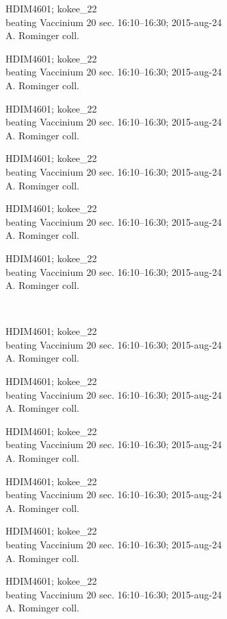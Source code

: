\documentclass[2pt]{extarticle}
\begin{document}
\noindent
\parbox{0.16\textwidth}{\tiny \raggedright \rule[-0.3\baselineskip]{0pt}{10pt}HDIM4601; kokee\_22\\ beating Vaccinium 20 sec. 16:10--16:30; 2015-aug-24\\ A. Rominger coll.}
\parbox{0.16\textwidth}{\tiny \raggedright \rule[-0.3\baselineskip]{0pt}{10pt}HDIM4601; kokee\_22\\ beating Vaccinium 20 sec. 16:10--16:30; 2015-aug-24\\ A. Rominger coll.}
\parbox{0.16\textwidth}{\tiny \raggedright \rule[-0.3\baselineskip]{0pt}{10pt}HDIM4601; kokee\_22\\ beating Vaccinium 20 sec. 16:10--16:30; 2015-aug-24\\ A. Rominger coll.}
\parbox{0.16\textwidth}{\tiny \raggedright \rule[-0.3\baselineskip]{0pt}{10pt}HDIM4601; kokee\_22\\ beating Vaccinium 20 sec. 16:10--16:30; 2015-aug-24\\ A. Rominger coll.}
\parbox{0.16\textwidth}{\tiny \raggedright \rule[-0.3\baselineskip]{0pt}{10pt}HDIM4601; kokee\_22\\ beating Vaccinium 20 sec. 16:10--16:30; 2015-aug-24\\ A. Rominger coll.}
\parbox{0.16\textwidth}{\tiny \raggedright \rule[-0.3\baselineskip]{0pt}{10pt}HDIM4601; kokee\_22\\ beating Vaccinium 20 sec. 16:10--16:30; 2015-aug-24\\ A. Rominger coll.} \\ 
\vspace{0.001in} 

\noindent
\parbox{0.16\textwidth}{\tiny \raggedright \rule[-0.3\baselineskip]{0pt}{10pt}HDIM4601; kokee\_22\\ beating Vaccinium 20 sec. 16:10--16:30; 2015-aug-24\\ A. Rominger coll.}
\parbox{0.16\textwidth}{\tiny \raggedright \rule[-0.3\baselineskip]{0pt}{10pt}HDIM4601; kokee\_22\\ beating Vaccinium 20 sec. 16:10--16:30; 2015-aug-24\\ A. Rominger coll.}
\parbox{0.16\textwidth}{\tiny \raggedright \rule[-0.3\baselineskip]{0pt}{10pt}HDIM4601; kokee\_22\\ beating Vaccinium 20 sec. 16:10--16:30; 2015-aug-24\\ A. Rominger coll.}
\parbox{0.16\textwidth}{\tiny \raggedright \rule[-0.3\baselineskip]{0pt}{10pt}HDIM4601; kokee\_22\\ beating Vaccinium 20 sec. 16:10--16:30; 2015-aug-24\\ A. Rominger coll.}
\parbox{0.16\textwidth}{\tiny \raggedright \rule[-0.3\baselineskip]{0pt}{10pt}HDIM4601; kokee\_22\\ beating Vaccinium 20 sec. 16:10--16:30; 2015-aug-24\\ A. Rominger coll.}
\parbox{0.16\textwidth}{\tiny \raggedright \rule[-0.3\baselineskip]{0pt}{10pt}HDIM4601; kokee\_22\\ beating Vaccinium 20 sec. 16:10--16:30; 2015-aug-24\\ A. Rominger coll.} \\ 
\vspace{0.001in} 
\end{document}
